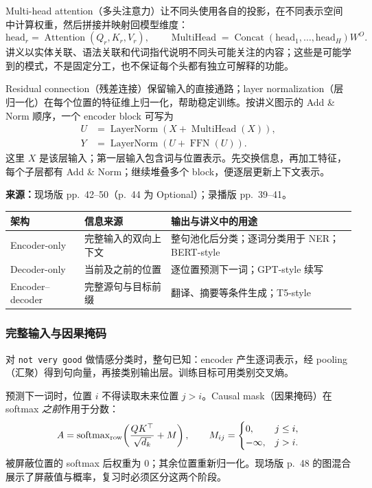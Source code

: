 Multi-head attention（多头注意力）让不同头使用各自的投影，在不同表示空间中计算权重，然后拼接并映射回模型维度：
\[
 \mathrm{head}_r=\operatorname{Attention}(Q_r,K_r,V_r),\qquad
 \operatorname{MultiHead}=\operatorname{Concat}(\mathrm{head}_1,\ldots,\mathrm{head}_H)W^O.
\]
讲义以实体关联、语法关联和代词指代说明不同头可能关注的内容；这些是可能学到的模式，不是固定分工，也不保证每个头都有独立可解释的功能。

Residual connection（残差连接）保留输入的直接通路；layer normalization（层归一化）在每个位置的特征维上归一化，帮助稳定训练。按讲义图示的 Add \& Norm 顺序，一个 encoder block 可写为
\begin{align*}
 U&=\operatorname{LayerNorm}\!\left(X+\operatorname{MultiHead}(X)\right),\\
 Y&=\operatorname{LayerNorm}\!\left(U+\operatorname{FFN}(U)\right).
\end{align*}
这里 $X$ 是该层输入；第一层输入包含词与位置表示。先交换信息，再加工特征，每个子层都有 Add \& Norm；继续堆叠多个 block，便逐层更新上下文表示。

\nopagebreak[4]
\textbf{来源：}现场版 pp.~42--50（p.~44 为 Optional）；录播版 pp.~39--41。

\begin{center}
\small
\begin{tabularx}{\textwidth}{@{}lXX@{}}
\toprule
架构 & 信息来源 & 输出与讲义中的用途 \\
\midrule
Encoder-only & 完整输入的双向上下文 & 整句池化后分类；逐词分类用于 NER；BERT-style \\
Decoder-only & 当前及之前的位置 & 逐位置预测下一词；GPT-style 续写 \\
Encoder--decoder & 完整源句与目标前缀 & 翻译、摘要等条件生成；T5-style \\
\bottomrule
\end{tabularx}
\end{center}

\subsubsection{完整输入与因果掩码}

对 \texttt{not very good} 做情感分类时，整句已知：encoder 产生逐词表示，经 pooling（汇聚）得到句向量，再接类别输出层。训练目标可用类别交叉熵。

预测下一词时，位置 $i$ 不得读取未来位置 $j>i$。Causal mask（因果掩码）在 softmax \emph{之前}作用于分数：
\[
 A=\operatorname{softmax}_{\rm row}\!\left(\frac{QK^\top}{\sqrt{d_k}}+M\right),
 \qquad
 M_{ij}=\begin{cases}0,&j\le i,\\-\infty,&j>i.\end{cases}
\]
被屏蔽位置的 softmax 后权重为 $0$；其余位置重新归一化。现场版 p.~48 的图混合展示了屏蔽值与概率，复习时必须区分这两个阶段。

